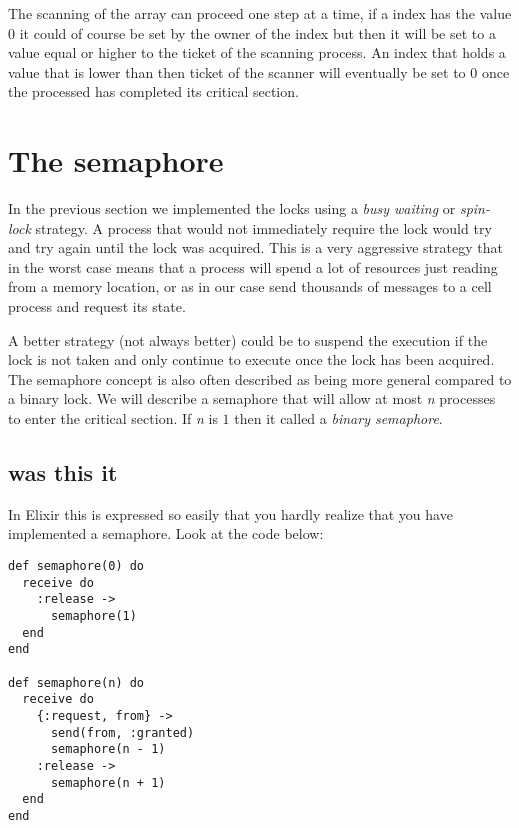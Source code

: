 \documentclass[a4paper,11pt]{article}
\begin{document}
The scanning of the array can proceed one step at a time, if a index
has the value $0$
it could of course be set by the owner of the index but then it will be
set to a value equal or higher to the ticket of the scanning
process. An index that holds a value that is lower than then ticket of
the scanner will eventually be set to $0$
once the processed has completed its critical section. 




\section{The semaphore}

In the previous section we implemented the locks using a {\em busy
  waiting} or {\em spin-lock} strategy. A process that would not
immediately require the lock would try and try again until the lock
was acquired. This is a very aggressive strategy that in the worst case
means that a process will spend a lot of resources just reading from a
memory location, or as in our case send thousands of messages to a
cell process and request its state.

A better strategy (not always better) could be to suspend the
execution if the lock is not taken and only continue to execute once
the lock has been acquired. The semaphore concept is also often
described as being more general compared to a binary lock. We will
describe a semaphore that will allow at most {\em n} processes to
enter the critical section. If {\em n} is $1$
then it called a {\em binary semaphore}.


\subsection{was this it}

In Elixir this is expressed so easily that you hardly realize that you
have implemented a semaphore. Look at the code below:

\begin{verbatim}
def semaphore(0) do
  receive do
    :release ->
      semaphore(1)
  end
end

def semaphore(n) do
  receive do
    {:request, from} ->
      send(from, :granted)
      semaphore(n - 1)
    :release ->
      semaphore(n + 1)
  end
end
\end{verbatim}
\end{document}
